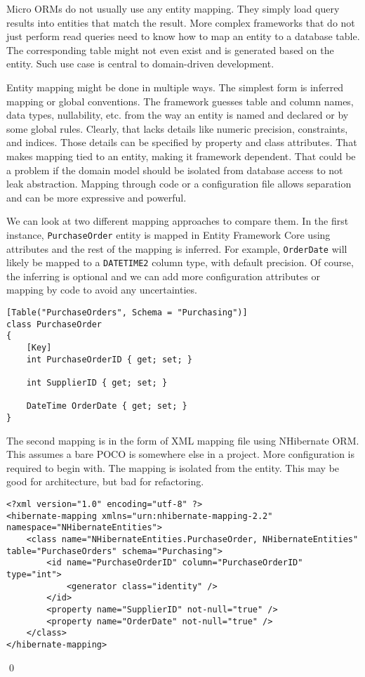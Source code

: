 Micro ORMs do not usually use any entity mapping. They simply load query results into entities that match the result. More complex frameworks that do not just perform read queries need to know how to map an entity to a database table. The corresponding table might not even exist and is generated based on the entity. Such use case is central to domain-driven development\cite{FowlerDDD}.

Entity mapping might be done in multiple ways. The simplest form is inferred mapping or global conventions. The framework guesses table and column names, data types, nullability, etc. from the way an entity is named and declared or by some global rules. Clearly, that lacks details like numeric precision, constraints, and indices. Those details can be specified by property and class attributes. That makes mapping tied to an entity, making it framework dependent. That could be a problem if the domain model should be isolated from database access to not leak abstraction. Mapping through code or a configuration file allows separation and can be more expressive and powerful.

\begin{example}
We can look at two different mapping approaches to compare them. In the first instance, \texttt{PurchaseOrder} entity is mapped in Entity Framework Core using attributes and the rest of the mapping is inferred. For example, \texttt{OrderDate} will likely be mapped to a \texttt{DATETIME2} column type, with default precision. Of course, the inferring is optional and we can add more configuration attributes or mapping by code to avoid any uncertainties. 
\begin{lstlisting}[language=CSharp]
[Table("PurchaseOrders", Schema = "Purchasing")]
class PurchaseOrder
{
    [Key]
    int PurchaseOrderID { get; set; }

    int SupplierID { get; set; }

    DateTime OrderDate { get; set; }
}
\end{lstlisting}
The second mapping is in the form of XML mapping file using NHibernate ORM. This assumes a bare POCO is somewhere else in a project.  More configuration is required to begin with. The mapping is isolated from the entity. This may be good for architecture, but bad for refactoring.
\begin{lstlisting}[language=CSharp]
<?xml version="1.0" encoding="utf-8" ?>
<hibernate-mapping xmlns="urn:nhibernate-mapping-2.2" namespace="NHibernateEntities">
    <class name="NHibernateEntities.PurchaseOrder, NHibernateEntities" table="PurchaseOrders" schema="Purchasing">
        <id name="PurchaseOrderID" column="PurchaseOrderID" type="int">
            <generator class="identity" />
        </id>
        <property name="SupplierID" not-null="true" />
        <property name="OrderDate" not-null="true" />
    </class>
</hibernate-mapping>
\end{lstlisting}
\qed
\end{example}

